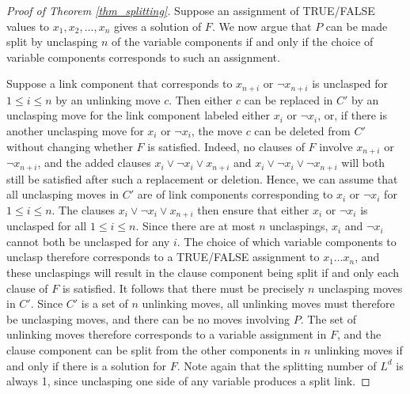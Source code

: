 \documentclass[12pt]{amsart}
\theoremstyle{definition}
\theoremstyle{remark}
\begin{document}
\begin{proof}[Proof of Theorem \ref{thm_splitting}]
Suppose an assignment of TRUE/FALSE values to $x_1, x_2, ..., x_n$ gives a solution of $F$. We now argue that $P$ can be made split by unclasping $n$ of the variable components if and only if the choice of variable components corresponds to such an assignment.


Suppose a link component that corresponds to $x_{n+i}$ or $\neg x_{n+i}$ is unclasped for $1 \le i \le n$ by an unlinking move $c$. Then either $c$ can be replaced in $C'$ by an unclasping move for the link component labeled either $x_i$ or $\neg x_i$, or, if there is another unclasping move for $x_i$ or $\neg x_i$, the move $c$ can be deleted from $C'$ without changing whether $F$ is satisfied.  Indeed, no clauses of $F$ involve $x_{n+i}$ or $\neg x_{n+i}$, and the added clauses $x_i \vee \neg x_i \vee x_{n+i}$ and $x_i \vee \neg x_i \vee \neg x_{n+i}$ will both still be satisfied after such a replacement or deletion.  Hence, we can assume that all unclasping moves in $C'$ are of link components corresponding to $x_i$ or $\neg x_i$ for $1 \le i \le n$.  The clauses $x_i \vee \neg x_i \vee x_{n+i}$ then ensure that either $x_i$ or $\neg x_i$ is unclasped for all $1 \le i \le n$.  Since there are at most $n$ unclaspings, $x_i$ and $\neg x_i$ cannot both be unclasped for any $i$.  The choice of which variable components to unclasp therefore corresponds to a TRUE/FALSE assignment to $x_1 \dots x_n$, and these unclaspings will result in the clause component being split if and only each clause of $F$ is satisfied.  It follows that there must be precisely $n$ unclasping moves in $C'$.  Since $C'$ is a set of $n$ unlinking moves, all unlinking moves must therefore be unclasping moves, and there can be no moves involving $P$. The set of unlinking moves therefore corresponds to a variable assignment in $F$, and the clause component can be split from the other components in $n$ unlinking moves if and only if there is a solution for $F$.  Note again that the splitting number of $L^d$ is always 1, since unclasping one side of any variable produces a split link.


\end{proof}
\end{document}
